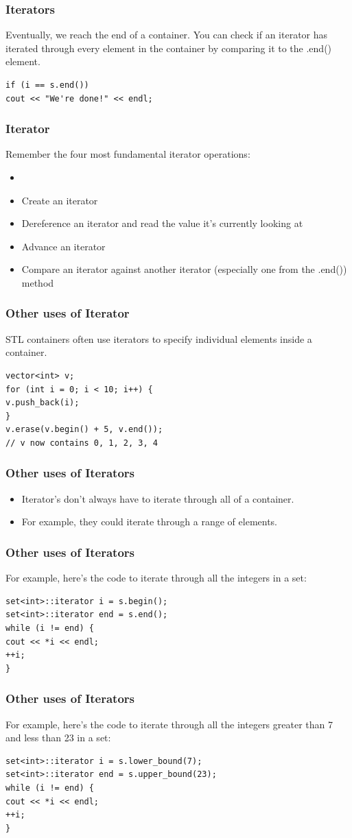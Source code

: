 \documentclass{beamer}
\newtheorem{Key points}{Key points}
\begin{document}
\begin{frame}[fragile]
  \frametitle{Iterators}
  Eventually, we reach the end of a container.
You can check if an iterator has iterated
through every element in the container by
comparing it to the .end() element.
\begin{lstlisting}
if (i == s.end())
cout << "We're done!" << endl;
\end{lstlisting}
\end{frame}
\begin{frame}
  \frametitle{Iterator}
Remember the four most fundamental iterator
operations:
  \begin{itemize}
  \item 
\item Create an iterator
\item Dereference an iterator and read the value
it's currently looking at
\item Advance an iterator
\item Compare an iterator against another iterator
(especially one from the .end()) method

  \end{itemize}
\end{frame}
\begin{frame}[fragile]
 \frametitle{Other uses of Iterator}
STL containers often use iterators to specify
individual elements inside a container.
\begin{lstlisting}
vector<int> v;
for (int i = 0; i < 10; i++) {
v.push_back(i);
}
v.erase(v.begin() + 5, v.end());
// v now contains 0, 1, 2, 3, 4
\end{lstlisting}
\end{frame}
\begin{frame}
  \frametitle{Other uses of Iterators}
  \begin{itemize}
  \item Iterator's don't always have to iterate through
all of a container.
\item For example, they could iterate through a range
of elements.
  \end{itemize}
\end{frame}
\begin{frame}[fragile]
  \frametitle{Other uses of Iterators}
For example, here's the code to iterate through
all the integers in a set:
\begin{lstlisting}
set<int>::iterator i = s.begin();
set<int>::iterator end = s.end();
while (i != end) {
cout << *i << endl;
++i;
}
\end{lstlisting}
\end{frame}

\begin{frame}[fragile]
  \frametitle{Other uses of Iterators}
For example, here's the code to iterate through
all the integers greater than 7 and less than
23 in a set:
\begin{lstlisting}
set<int>::iterator i = s.lower_bound(7);
set<int>::iterator end = s.upper_bound(23);
while (i != end) {
cout << *i << endl;
++i;
}

\end{lstlisting}
\end{frame}
\end{document}
